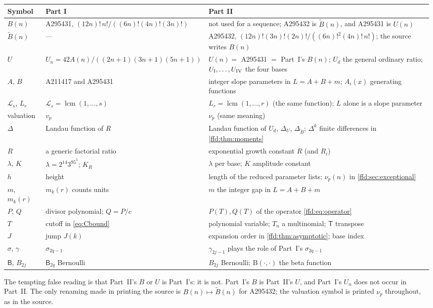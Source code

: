 \documentclass[11pt]{article}
\theoremstyle{definition}
\theoremstyle{remark}
\newcommand{\lcm}{\operatorname{lcm}}
\newcommand{\LL}{\mathcal L}
\newcommand{\T}{\mathsf T}
\newcommand{\tB}{\widetilde B}
\begin{document}
\begin{center}
\small
\renewcommand{\arraystretch}{1.2}
\begin{tabular}{p{}p{}p{}}
\toprule
Symbol & Part I & Part II\\
\midrule
$B(n)$ & A295431, $(12n)!\,n!/((6n)!(4n)!(3n)!)$ & not used for a sequence; A295432 is $\tB(n)$, and A295431 is $U(n)$\\
$\tB(n)$ & --- & A295432, $(12n)!(3n)!(2n)!/((6n)!^2(4n)!\,n!)$; the source writes $B(n)$\\
$U$ & $U_n=42A(n)/((2n+1)(3n+1)(5n+1))$ & $U(n)=$ A295431 $=$ Part~I's $B(n)$; $U_d$ the general ordinary ratio; $U_{\rm I},\dots,U_{\rm IV}$ the four bases\\
$A$, $B$ & A211417 and A295431 & integer slope parameters in $L=A+B+m$; $A_i(x)$ generating functions\\
$\LL_s$, $L_r$ & $\LL_s=\lcm(1,\dots,s)$ & $L_r=\lcm(1,\dots,r)$ (the same function); $L$ alone is a slope parameter\\
valuation & $v_p$ & $\nu_p$ (same meaning)\\
$\Delta$ & Landau function of $R$ & Landau function of $U_d$, $\Delta_U$, $\Delta_{\tB}$; $\Delta^k$ finite differences in \cref{ffd:thm:moments}\\
$R$ & a generic factorial ratio & exponential growth constant $R$ (and $R_i$)\\
$\lambda$, $K$ & $\lambda=2^{14}3^95^5$; $K_R$ & $\lambda$ per base; $K$ amplitude constant\\
$h$ & height & length of the reduced parameter lists; $\nu_p(n)$ in \cref{ffd:sec:exceptional}\\
$m$, $m_k(r)$ & $m_k(r)$ counts units & $m$ the integer gap in $L=A+B+m$\\
$P$, $Q$ & divisor polynomial; $Q=P/c$ & $P(T),Q(T)$ of the operator \eqref{ffd:eq:operator}\\
$T$ & cutoff in \eqref{eq:Cbound} & polynomial variable; $T_n$ a multinomial; $\T$ transpose\\
$J$ & jump $J(k)$ & expansion order in \cref{ffd:thm:asymptotic}; base index\\
$\sigma$, $\gamma$ & $\sigma_{2q-1}$ & $\gamma_{2j-1}$ plays the role of Part~I's $\sigma_{2q-1}$\\
$\mathsf B$, $B_{2j}$ & $\mathsf B_{2q}$ Bernoulli & $B_{2j}$ Bernoulli; $\mathrm B(\cdot,\cdot)$ the beta function\\
\bottomrule
\end{tabular}
\end{center}
The tempting false reading is that Part~II's $B$ or $U$ is Part~I's: it is
not. Part~I's $B$ is Part~II's $U$, and Part~I's $U_n$ does not occur in
Part~II. The only renaming made in printing the source is $B(n)\mapsto\tB(n)$
for A295432; the valuation symbol is printed $\nu_p$ throughout, as in the
source.
\end{document}
